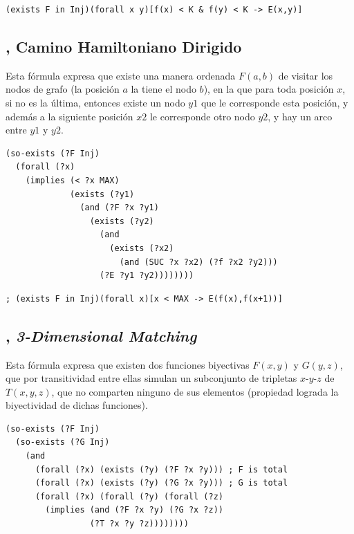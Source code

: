 \begin{verbatim}
(exists F in Inj)(forall x y)[f(x) < K & f(y) < K -> E(x,y)]
\end{verbatim}

\subsection{\CHD, Camino Hamiltoniano Dirigido}
Esta fórmula expresa que existe una manera ordenada $F(a,b)$ de visitar los nodos de grafo (la posición $a$ la tiene el nodo $b$), en
la que para toda posición $x$, si no es la última, entonces existe un nodo $y1$ que le corresponde esta posición, y además
a la siguiente posición $x2$ le corresponde otro nodo $y2$, y hay un arco entre $y1$ y $y2$.
\begin{verbatim}
(so-exists (?F Inj)
  (forall (?x)
    (implies (< ?x MAX)
             (exists (?y1)
               (and (?F ?x ?y1)
                 (exists (?y2)
                   (and
                     (exists (?x2) 
                       (and (SUC ?x ?x2) (?f ?x2 ?y2)))
                   (?E ?y1 ?y2))))))))
\end{verbatim}
\begin{verbatim}
; (exists F in Inj)(forall x)[x < MAX -> E(f(x),f(x+1))]
\end{verbatim}

\subsection{\TDM, \textit{3-Dimensional Matching}}
Esta fórmula expresa que existen dos funciones biyectivas $F(x,y)$ y $G(y,z)$, que por 
transitividad entre ellas simulan un subconjunto de tripletas $x$-$y$-$z$ de  $T(x,y,z)$,
que no comparten ninguno de sus elementos (propiedad lograda la biyectividad de
dichas funciones).
\begin{verbatim}
(so-exists (?F Inj)
  (so-exists (?G Inj)
    (and
      (forall (?x) (exists (?y) (?F ?x ?y))) ; F is total
      (forall (?x) (exists (?y) (?G ?x ?y))) ; G is total
      (forall (?x) (forall (?y) (forall (?z)
        (implies (and (?F ?x ?y) (?G ?x ?z))
                 (?T ?x ?y ?z))))))))
\end{verbatim}

